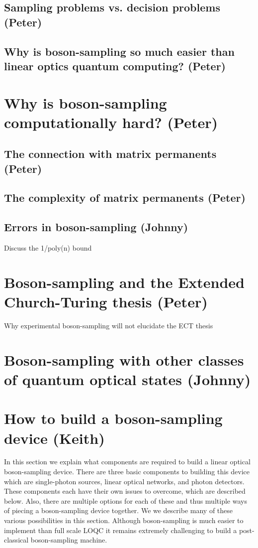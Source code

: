 \documentclass[aps,pra,twocolumn,amsmath,amssymb,nofootinbib,superscriptaddress]{revtex4}
\begin{document}
\subsection{Sampling problems vs. decision problems (Peter)}

\subsection{Why is boson-sampling so much easier than linear optics quantum computing? (Peter)}

\section{Why is boson-sampling computationally hard? (Peter)}

\subsection{The connection with matrix permanents (Peter)}

\subsection{The complexity of matrix permanents (Peter)}

\subsection{Errors in boson-sampling (Johnny)}
Discuss the 1/poly(n) bound

\section{Boson-sampling and the Extended Church-Turing thesis (Peter)}
Why experimental boson-sampling will not elucidate the ECT thesis

\section{Boson-sampling with other classes of quantum optical states (Johnny)}

\section{How to build a boson-sampling device (Keith)}

In this section we explain what components are required to build a linear optical boson-sampling device. There are three basic components to building this device which are single-photon sources, linear optical networks, and photon detectors. These components each have their own issues to overcome, which are described below. Also, there are multiple options for each of these and thus multiple ways of piecing a boson-sampling device together. We we describe many of these various possibilities in this section. Although boson-sampling is much easier to implement than full scale LOQC it remains extremely challenging to build a post-classical boson-sampling machine. 
\end{document}
